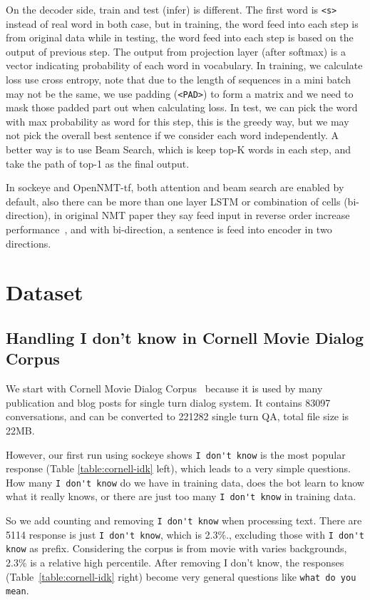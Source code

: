\documentclass{article}
\begin{document}
On the decoder side, train and test (infer) is different.
The first word is \verb+<s>+ instead of real word in both case, but in training, the word feed into each step is from
original data while in testing, the word feed into each step is based on the output of previous step.
The output from projection layer (after softmax) is a vector indicating probability of each word in vocabulary.
In training, we calculate loss use cross entropy, note that due to the length of sequences in a mini batch may not be the same,
we use padding (\verb+<PAD>+) to form a matrix and we need to mask those padded part out when calculating loss.
In test, we can pick the word with max probability as word for this step, this is the greedy way,
but we may not pick the overall best sentence if we consider each word independently.
A better way is to use Beam Search, which is keep top-K words in each step, and take the path of top-1 as the final output.

In sockeye and OpenNMT-tf, both attention and beam search are enabled by default, also there can be more than one layer LSTM
or combination of cells (bi-direction), in original NMT paper they say feed input in reverse order increase performance~\cite{sutskever2014sequence},
and with bi-direction, a sentence is feed into encoder in two directions.

\section{Dataset}
\label{sec:dataset}

\subsection{Handling I don't know in Cornell Movie Dialog Corpus}
\label{subsec:idk}

We start with Cornell Movie Dialog Corpus~\cite{data:cornell} because it is used by many publication and blog posts for single turn dialog system.
It contains 83097 conversations, and can be converted to 221282 single turn QA, total file size is 22MB.

However, our first run using sockeye shows \verb+I don't know+ is the most popular response (Table \ref{table:cornell-idk} left),
which leads to a very simple questions. How many \verb+I don't know+ do we have in training data,
does the bot learn to know what it really knows, or there are just too many \verb+I don't know+ in training data.

So we add counting and removing \verb+I don't know+ when processing text.
There are 5114 response is just \verb+I don't know+, which is 2.3\%., excluding those with \verb+I don't know+ as prefix.
Considering the corpus is from movie with varies backgrounds, 2.3\% is a relative high percentile.
After removing I don't know, the responses (Table~\ref{table:cornell-idk} right) become very general questions like \verb+what do you mean+.
\end{document}
